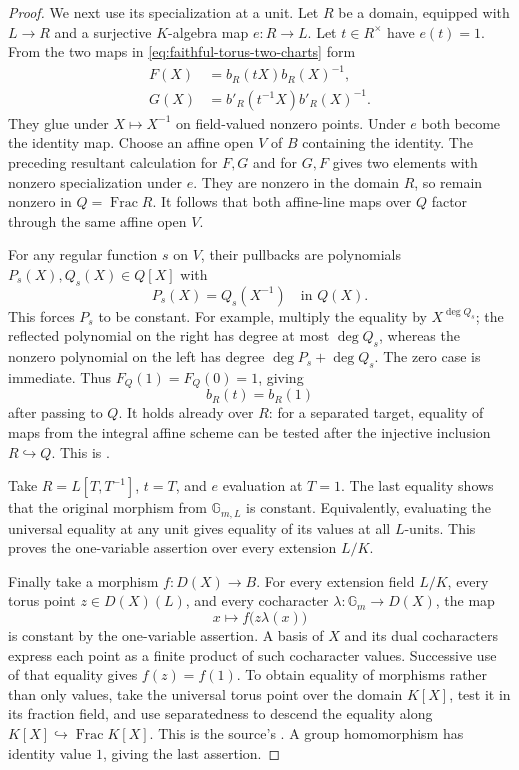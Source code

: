 \begin{proof}
We next use its specialization at a unit.
Let \(R\) be a domain, equipped with \(L\to R\) and a surjective
\(K\)-algebra map \(e:R\to L\).
Let \(t\in R^\times\) have \(e(t)=1\).
From the two maps in \eqref{eq:faithful-torus-two-charts} form
\[
 \begin{split}
 F(X)&=b_R(tX)b_R(X)^{-1},\\
 G(X)&=b'_R(t^{-1}X)b'_R(X)^{-1}.
 \end{split}
\]
They glue under \(X\mapsto X^{-1}\) on field-valued nonzero
points.  Under \(e\) both become the identity map.
Choose an affine open \(V\) of \(B\) containing the identity.
The preceding resultant calculation for \(F,G\) and for \(G,F\)
gives two elements with nonzero specialization under \(e\).
They are nonzero in the domain \(R\), so remain nonzero in
\(Q=\operatorname{Frac}R\).
It follows that both affine-line maps over \(Q\) factor through
the same affine open \(V\).

For any regular function \(s\) on \(V\), their pullbacks are
polynomials \(P_s(X),Q_s(X)\in Q[X]\) with
\[
                          P_s(X)=Q_s(X^{-1})\quad\text{in }Q(X).
\]
This forces \(P_s\) to be constant.
For example, multiply the equality by \(X^{\deg Q_s}\);
the reflected polynomial on the right has degree at most
\(\deg Q_s\), whereas the nonzero polynomial on the left
has degree \(\deg P_s+\deg Q_s\).
The zero case is immediate.
Thus \(F_Q(1)=F_Q(0)=1\), giving
\[
                            b_R(t)=b_R(1)
\]
after passing to \(Q\).
It holds already over \(R\): for a separated target, equality
of maps from the integral affine scheme can be tested after
the injective inclusion \(R\hookrightarrow Q\).
This is .

Take \(R=L[T,T^{-1}]\), \(t=T\), and \(e\) evaluation at \(T=1\).
The last equality shows that the original morphism from
\(\mathbb G_{m,L}\) is constant.  Equivalently, evaluating the
universal equality at any unit gives equality of its values at
all \(L\)-units.  This proves the one-variable assertion over
every extension \(L/K\).

Finally take a morphism \(f:D(X)\to B\).
For every extension field \(L/K\), every torus point \(z\in D(X)(L)\),
and every cocharacter \(\lambda:\mathbb G_m\to D(X)\), the map
\[
                x\longmapsto f\bigl(z\lambda(x)\bigr)
\]
is constant by the one-variable assertion.
A basis of \(X\) and its dual cocharacters express each point
as a finite product of such cocharacter values.  Successive
use of that equality gives \(f(z)=f(1)\).
To obtain equality of morphisms rather than only values, take
the universal torus point over the domain \(K[X]\), test it in
its fraction field, and use separatedness to descend the
equality along \(K[X]\hookrightarrow\operatorname{Frac}K[X]\).
This is the source's .
A group homomorphism has identity value \(1\), giving the
last assertion.
\end{proof}

